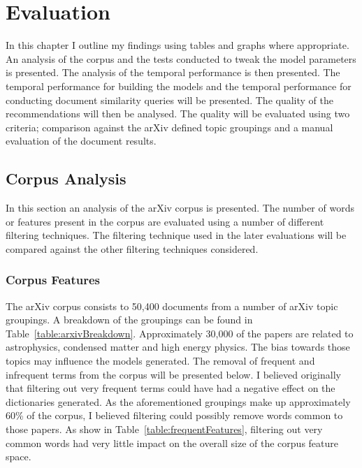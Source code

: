 \chapter{Evaluation}
In this chapter I outline my findings using tables and graphs where appropriate.
An analysis of the corpus and the tests conducted to tweak the model parameters is presented.
The analysis of the temporal performance is then presented.
The temporal performance for building the models and the temporal performance for conducting document similarity queries will be presented.
The quality of the recommendations will then be analysed.
The quality will be evaluated using two criteria; comparison against the arXiv defined topic groupings and a manual evaluation of the document results.

\section{Corpus Analysis}
In this section an analysis of the arXiv corpus is presented.
The number of words or features present in the corpus are evaluated using a number of different filtering techniques.
The filtering technique used in the later evaluations will be compared against the other filtering techniques considered.

\subsection{Corpus Features}
The arXiv corpus consists to 50,400 documents from a number of arXiv topic groupings.
A breakdown of the groupings can be found in Table~\ref{table:arxivBreakdown}.
Approximately 30,000 of the papers are related to astrophysics, condensed matter and high energy physics.
The bias towards those topics may influence the models generated.
The removal of frequent and infrequent terms from the corpus will be presented below.
I believed originally that filtering out very frequent terms could have had a negative effect on the dictionaries generated.
As the aforementioned groupings make up approximately 60\% of the corpus, I believed filtering could possibly remove words common to those papers.
As show in Table~\ref{table:frequentFeatures}, filtering out very common words had very little impact on the overall size of the corpus feature space.

